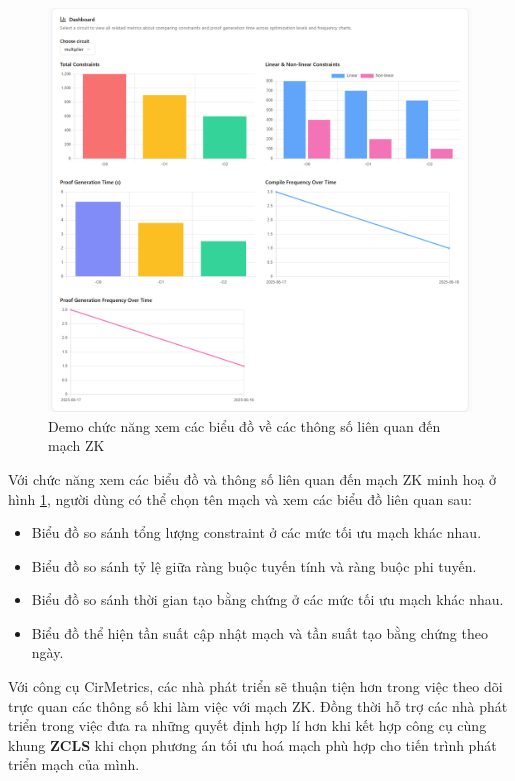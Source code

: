 \begin{figure}[H]
    \centering
    \includegraphics[width=\textwidth]{imgs/dashboardscreen.png}
    \caption{Demo chức năng xem các biểu đồ về các thông số liên quan đến mạch ZK}
    \label{fig:chapter6-dashboardscreen}
\end{figure}

Với chức năng xem các biểu đồ và thông số liên quan đến mạch ZK minh hoạ ở hình \ref{fig:chapter6-dashboardscreen}, người dùng có thể chọn tên mạch và xem các biểu đồ liên quan sau:
\begin{itemize}
    \item Biểu đồ so sánh tổng lượng constraint ở các mức tối ưu mạch khác nhau.
    \item Biểu đồ so sánh tỷ lệ giữa ràng buộc tuyến tính và ràng buộc phi tuyến.
    \item Biểu đồ so sánh thời gian tạo bằng chứng ở các mức tối ưu mạch khác nhau.
    \item Biểu đồ thể hiện tần suất cập nhật mạch và tần suất tạo bằng chứng theo ngày.
\end{itemize}

Với công cụ CirMetrics, các nhà phát triển sẽ thuận tiện hơn trong việc theo dõi trực quan các thông số khi làm việc với mạch ZK. Đồng thời hỗ trợ các nhà phát triển trong việc đưa ra những quyết định hợp lí hơn khi kết hợp công cụ cùng khung \textbf{ZCLS} khi chọn phương án tối ưu hoá mạch phù hợp cho tiến trình phát triển mạch của mình.